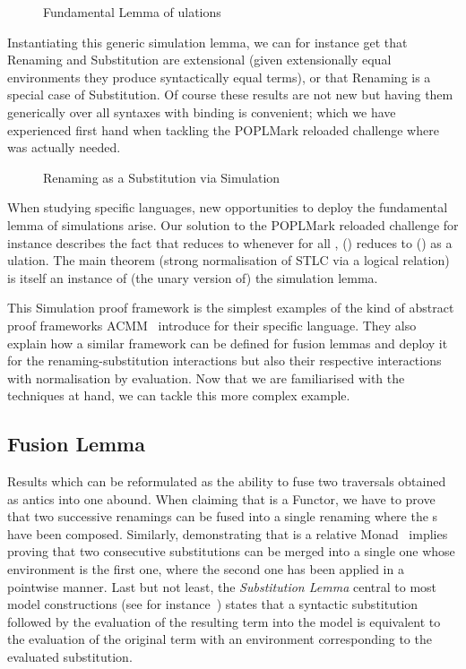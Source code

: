 \begin{figure}[h]
\caption{Fundamental Lemma of ulations}
\end{figure}

Instantiating this generic simulation lemma, we can for instance get
that Renaming and Substitution are extensional (given extensionally
equal environments they produce syntactically equal terms), or that
Renaming is a special case of Substitution. Of course these results
are not new but having them generically over all syntaxes with binding
is convenient; which we have experienced first hand when tackling the
POPLMark reloaded challenge where  was actually needed.

\begin{figure}[h]
\caption{Renaming as a Substitution via Simulation}
\end{figure}

When studying specific languages, new opportunities to deploy the
fundamental lemma of simulations arise. Our solution to the POPLMark
reloaded challenge for instance describes the fact that { \AB{\rho} }
reduces to {  } whenever for all ,
\AB{\rho}() reduces to () as a ulation.
The main theorem (strong normalisation of STLC via a logical relation)
is itself an instance of (the unary version of) the simulation lemma.

This Simulation proof framework is the simplest examples of the kind of abstract
proof frameworks ACMM~\citeyear{allais2017type} introduce for their
specific language. They also explain how a similar framework can be defined
for fusion lemmas and deploy it for the renaming-substitution interactions
but also their respective interactions with normalisation by evaluation.
Now that we are familiarised with the techniques at hand, we can tackle
this more complex example.



\subsection{Fusion Lemma}

Results which can be reformulated as the ability to fuse two traversals
obtained as antics into one abound. When claiming that  is
a Functor, we have to prove that two successive renamings can be fused into
a single renaming where the s have been composed. Similarly,
demonstrating that  is a relative Monad~\cite{JFR4389} implies proving
that two consecutive substitutions can be merged into a single one whose
environment is the first one, where the second one has been applied in a
pointwise manner. Last but not least, the \emph{Substitution Lemma} central
to most model constructions (see for instance~\cite{mitchell1991kripke}) states
that a syntactic substitution followed by the evaluation of the resulting term
into the model is equivalent to the evaluation of the original term with an
environment corresponding to the evaluated substitution.

